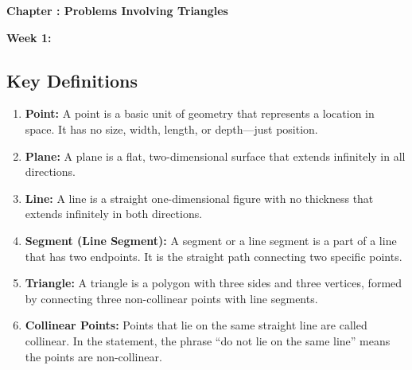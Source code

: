 \documentclass[11pt]{article}
\newcommand{\chapter}[1]{
	\clearpage
	\vspace*{2em}
	{\Large\bfseries Chapter \thechapter: #1\par}
	\vspace{1em}
	\addtocounter{chapter}{1}
}
\newcounter{chapter}
\begin{document}
	
	\chapter{Problems Involving Triangles}
	
	\textbf{Week 1:}
	
	\subsection*{Key Definitions}
	
	\begin{enumerate}[label=\arabic*.]
		\item \textbf{Point:} A point is a basic unit of geometry that represents a location in space. It has no size, width, length, or depth—just position.
		\item \textbf{Plane:} A plane is a flat, two-dimensional surface that extends infinitely in all directions.
		\item \textbf{Line:} A line is a straight one-dimensional figure with no thickness that extends infinitely in both directions.
		\item \textbf{Segment (Line Segment):} A segment or a line segment is a part of a line that has two endpoints. It is the straight path connecting two specific points.
		\item \textbf{Triangle:} A triangle is a polygon with three sides and three vertices, formed by connecting three non-collinear points with line segments.
		\item \textbf{Collinear Points:} Points that lie on the same straight line are called collinear. In the statement, the phrase “do not lie on the same line” means the points are non-collinear.
	\end{enumerate}
	
\end{document}

